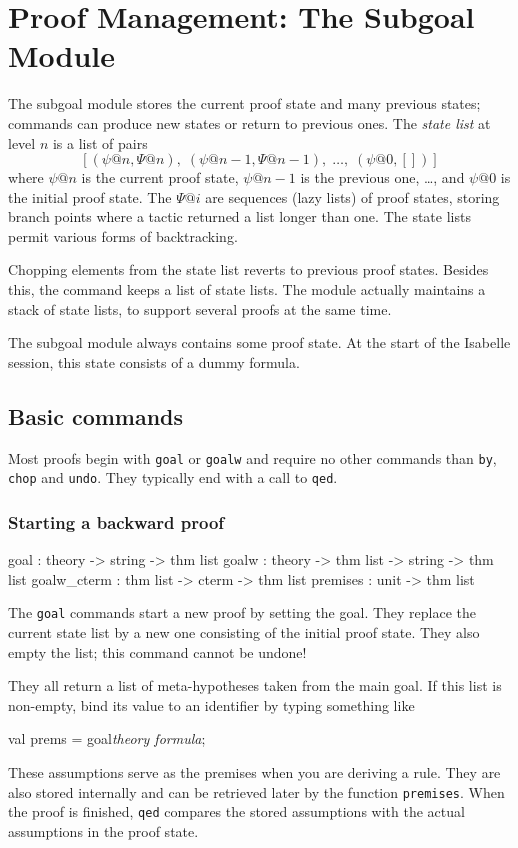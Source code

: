 \chapter{Proof Management: The Subgoal Module}

The subgoal module stores the current proof state and
many previous states; commands can produce new states or return to previous
ones.  The {\em state list\/} at level $n$ is a list of pairs
\[ [(\psi@n,\Psi@n),\; (\psi@{n-1},\Psi@{n-1}),\; \ldots,\; (\psi@0,[])] \]
where $\psi@n$ is the current proof state, $\psi@{n-1}$ is the previous
one, \ldots, and $\psi@0$ is the initial proof state.  The $\Psi@i$ are
sequences (lazy lists) of proof states, storing branch points where a
tactic returned a list longer than one.  The state lists permit various
forms of backtracking.

Chopping elements from the state list reverts to previous proof states.
Besides this, the  command keeps a list of state lists.  The
module actually maintains a stack of state lists, to support several
proofs at the same time.

The subgoal module always contains some proof state.  At the start of the
Isabelle session, this state consists of a dummy formula.


\section{Basic commands}
Most proofs begin with {\tt goal} or {\tt goalw} and require no other
commands than {\tt by}, {\tt chop} and {\tt undo}.  They typically end
with a call to {\tt qed}.
\subsection{Starting a backward proof}
\begin{ttbox} 
goal        : theory -> string -> thm list 
goalw       : theory -> thm list -> string -> thm list 
goalw_cterm : thm list -> cterm -> thm list 
premises    : unit -> thm list
\end{ttbox}
The {\tt goal} commands start a new proof by setting the goal.  They
replace the current state list by a new one consisting of the initial proof
state.  They also empty the  list; this command cannot be
undone!

They all return a list of meta-hypotheses taken from the main goal.  If
this list is non-empty, bind its value to an \ML{} identifier by typing
something like
\begin{ttbox} 
val prems = goal{\it theory\/ formula};
\end{ttbox}
These assumptions serve as the premises when you are deriving a rule.
They are also stored internally and can be retrieved later by the
function {\tt premises}.  When the proof is finished, {\tt qed}
compares the stored assumptions with the actual assumptions in the
proof state.

